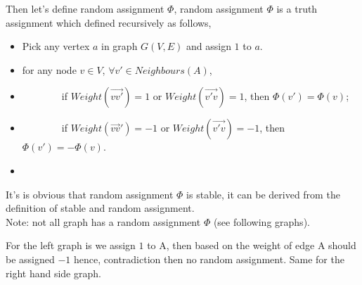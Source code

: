 \documentclass[11pt,twoside]{article}
\begin{document}
\begin{enumerate}[leftmargin=0pt]
\begin{enumerate}[topsep=\parsep]
	 Then let's define  random assignment $\Phi$,  random assignment $\Phi$ is a truth assignment which defined recursively as follows,
	 \begin{itemize}[label = {}]
	 \item Pick any vertex $a$ in graph $G(V,E)$ and assign $1$ to $a$.
	 \item for any node $v \in V$, $\forall v' \in Neighbours(A)$, 
	 \item \ \ \ \ \ \ \ \ if $Weight(\vec{vv'}) = 1$ or $Weight(\vec{v'v}) = 1$, then $\Phi(v') = \Phi(v)$;
	 \item  \ \ \ \ \ \ \ \ if $Weight(\vec{vv}') = -1$ or $Weight(\vec{v'v}) = -1$, then $\Phi(v') = -\Phi(v)$.
	 \item
	 \end{itemize} 
	 It's is obvious that random assignment $\Phi$ is stable, it can be derived from the definition of stable and random assignment.\\
	 Note: not all graph has a random assignment $\Phi$ (see following graphs).\\
	\begin{center}
           \end{center}
         For the left graph is we assign $1$ to A, then based on the weight of edge A should be assigned $-1$ hence, contradiction then no random assignment. Same for the right hand side graph.\\
         \\

\end{enumerate}
\end{enumerate}
\end{document}
